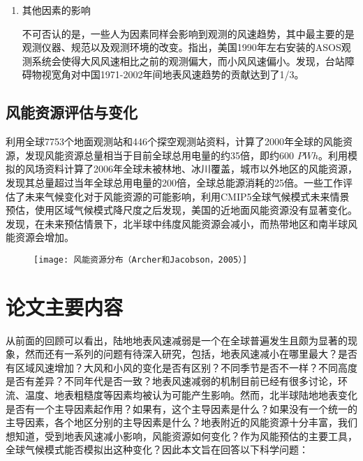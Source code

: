 \begin{enumerate}
\item 其他因素的影响

不可否认的是，一些人为因素同样会影响到观测的风速趋势，其中最主要的是观测仪器、规范以及观测环境的改变。\citet{mckee2000climate}指出，美国1990年左右安装的ASOS观测系统会使得大风风速相比之前的观测偏大，而小风风速偏小。\citet{刘学锋2012台站观测环境改变对我国近地面风速观测资料序列的影响}发现，台站障碍物视宽角对中国1971-2002年间地表风速趋势的贡献达到了1/3。

\end{enumerate}

\subsection{风能资源评估与变化}

\citet{archer2005evaluation}利用全球7753个地面观测站和446个探空观测站资料，计算了2000年全球的风能资源，发现风能资源总量相当于目前全球总用电量的约35倍，即约600 $PWh$。\citet{lu2009global}利用模拟的风场资料计算了2006年全球未被林地、冰川覆盖，城市以外地区的风能资源，发现其总量超过当年全球总用电量的200倍，全球总能源消耗的25倍。一些工作评估了未来气候变化对于风能资源的可能影响，\citet{pryor2011assessing}利用CMIP5全球气候模式未来情景预估，使用区域气候模式降尺度之后发现，美国的近地面风能资源没有显著变化。\citet{karnauskas2018southward}发现，在未来预估情景下，北半球中纬度风能资源会减小，而热带地区和南半球风能资源会增加。

\begin{figure}[!htbp]
    \centering
    \texttt{[image: 风能资源分布（Archer和Jacobson，2005）]}
    \label{fig:windenergyArcher2005}
\end{figure}

\section{论文主要内容}

从前面的回顾可以看出，陆地地表风速减弱是一个在全球普遍发生且颇为显著的现象，然而还有一系列的问题有待深入研究，包括，地表风速减小在哪里最大？是否有区域风速增加？大风和小风的变化是否有区别？不同季节是否不一样？不同高度是否有差异？不同年代是否一致？地表风速减弱的机制目前已经有很多讨论，环流、温度、地表粗糙度等因素均被认为可能产生影响。然而，北半球陆地地表变化是否有一个主导因素起作用？如果有，这个主导因素是什么？如果没有一个统一的主导因素，各个地区分别的主导因素是什么？地表附近的风能资源十分丰富，我们想知道，受到地表风速减小影响，风能资源如何变化？作为风能预估的主要工具，全球气候模式能否模拟出这种变化？因此本文旨在回答以下科学问题：

